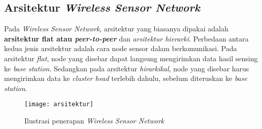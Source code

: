 \subsection{Arsitektur \textit{Wireless Sensor Network}}
\label{arsitektur}
Pada \textit{Wireless Sensor Network}, arsitektur yang biasanya dipakai adalah \textbf{arsitektur flat atau \textit{peer-to-peer}} dan \textit{arsitektur hierarki}. Perbedaan antara kedua jenis arsitektur adalah cara node sensor dalam berkomunikasi. Pada arsitektur \textit{flat}, node yang disebar dapat langsung mengirimkan data hasil sensing ke \textit{base station}. Sedangkan pada arsitektur \textit{hirarkikal}, node yang disebar harus mengirimkan data ke \textit{cluster head} terlebih dahulu, sebelum diteruskan ke \textit{base station}.

\begin{figure}[H] 
	\centering  
	\texttt{[image: arsitektur]}  
	\caption[Ilustrasi penerapan \textit{Wireless Sensor Network}]{Ilustrasi penerapan \textit{Wireless Sensor Network}}
	\label{fig:arsitektur} 
\end{figure}

